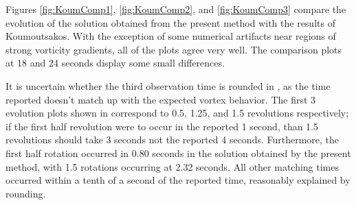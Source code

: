 \documentclass[letterpaper,12pt]{report}
\begin{document}
Figures \ref{fig:KoumComp1}, \ref{fig:KoumComp2}, and \ref{fig:KoumComp3} compare the evolution of the solution obtained from the present method with the results of Koumoutsakos. With the exception of some numerical artifacts near regions of strong vorticity gradients, all of the plots agree very well. The comparison plots at 18 and 24 seconds display some small differences.

It is uncertain whether the third observation time is rounded in \cite{Koum1997}, as the time reported doesn't match up with the expected vortex behavior. The first 3 evolution plots shown in \cite{Koum1997} correspond to 0.5, 1.25, and 1.5 revolutions respectively; if the first half revolution were to occur in the reported 1 second, than 1.5 revolutions should take 3 seconds not the reported 4 seconds. Furthermore, the first half rotation occurred in 0.80 seconds in the solution obtained by the present method, with 1.5 rotations occurring at 2.32 seconds. All other matching times occurred within a tenth of a second of the reported time, reasonably explained by rounding.
\end{document}
